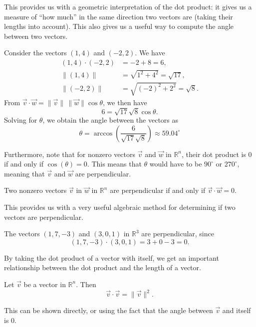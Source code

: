 \documentclass{ximera}
\begin{document}
This provides us with a geometric interpretation of the dot product: it gives us a measure of ``how much'' in the same direction two vectors are (taking their lengths into account). This also gives us a useful way to compute the angle between two vectors.

\begin{example}
Consider the vectors $(1,4)$ and $(-2,2)$. We have
\begin{align*}
(1,4)\cdot (-2,2) &= -2+8= 6,\\
\|(1,4)\| &= \sqrt{1^2+4^2} = \sqrt{17},\\
\|(-2,2)\| &= \sqrt{(-2)^2+2^2}=\sqrt{8}.
\end{align*}
From $\vec{v}\cdot\vec{w} = \|\vec{v}\|\,\|\vec{w}\|\cos\theta$, we then have
\[
6 = \sqrt{17}\sqrt{8}\cos\theta.
\]
Solving for $\theta$, we obtain the angle between the vectors as
\[
\theta = \arccos\left(\frac{6}{\sqrt{17}\sqrt{8}}\right)\approx 59.04^\circ
\]
\end{example}

Furthermore, note that for nonzero vectors $\vec{v}$ and $\vec{w}$ in $\mathbb{R}^n$, their dot product is $0$ if and only if $\cos(\theta) = 0$. This means that $\theta$ would have to be $90^\circ$ or $270^\circ$, meaning that $\vec{v}$ and $\vec{w}$ are perpendicular. 

\begin{proposition}
Two nonzero vectors $\vec{v}$ in $\vec{w}$ in $\mathbb{R}^n$ are perpendicular if and only if $\vec{v}\cdot\vec{w} = 0$.
\end{proposition}

This provides us with a very useful algebraic method for determining if two vectors are perpendicular.

\begin{example}
The vectors $(1,7,-3)$ and $(3,0,1)$ in $\mathbb{R}^3$ are perpendicular, since
\[
(1,7,-3)\cdot (3,0,1) = 3+0-3=0.
\]
\end{example}

By taking the dot product of a vector with itself, we get an important relationship between the dot product and the length of a vector.

\begin{proposition}
Let $\vec{v}$ be a vector in $\mathbb{R}^n$. Then
\[
\vec{v}\cdot\vec{v}=\|\vec{v}\|^2.
\]
\end{proposition}

This can be shown directly, or using the fact that the angle between $\vec{v}$ and itself is $0$.
\end{document}
